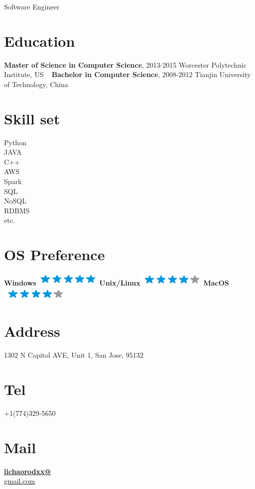 \documentclass[]{friggeri-cv}
\begin{document}
{Software Engineer}


\begin{aside}
	\section{Education}
	\textbf{Master of Science in 
	Computer Science}, 
	2013-2015
	Worcester Polytechnic 
	Institute, US
	~
	\textbf{Bachelor in 
	Computer Science}, 
	2008-2012
	Tianjin University of 
	Technology, China
	\section{Skill set}
	Python\\ JAVA\\ C++\\ AWS\\ Spark\\ SQL\\ NoSQL\\ RDBMS\\ etc.
	~
	\section{OS Preference}
	\textbf{Windows}\includegraphics[scale=0.40]{img/5stars.png}
	\textbf{Unix/Linux}\includegraphics[scale=0.40]{img/4stars.png}
	\textbf{MacOS}\includegraphics[scale=0.40]{img/4stars.png}
	~
	\section{Address}
	1302 N Capitol AVE,
	Unit 1,
	San Jose, 95132
	\section{Tel}
	+1(774)329-5650
	\section{Mail}
	\href{mailto:lichaorodxx@gmail.com}{\textbf{lichaorodxx@}\\gmail.com}
	~

\end{aside}
\end{document}

